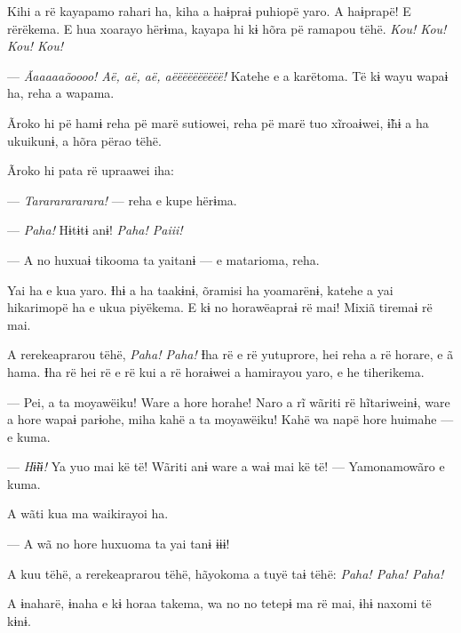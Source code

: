 Kihi a rë kayapamo rahari ha, kiha a haɨpraɨ puhiopë yaro. A haɨprapë! E
rërëkema. E hua xoarayo hërɨma, kayapa hi kɨ hõra pë ramapou tëhë. \textit{Kou! Kou! Kou! Kou!} 

--- \textit{Ãaaaaaõoooo! Aë, aë, aë, aëëëëëëëëëë!} Katehe e a
karëtoma. Të kɨ wayu wapaɨ ha, reha a wapama. 

Ãroko hi pë hamɨ reha pë marë sutiowei, reha pë marë tuo xĩroaɨwei, 
ɨ̃hɨ a ha ukuikunɨ, a hõra përao tëhë. 

Ãroko hi pata rë upraawei iha:

--- \textit{Tarararararara!} --- reha e kupe hërɨma. 


--- \textit{Paha!} Hɨtɨtɨ anɨ! \textit{Paha! Paiii!} 


--- A no huxuaɨ tikooma ta yaitanɨ --- e matarioma, reha. 

Yai ha e kua yaro. Ɨhɨ a ha taakɨnɨ, õramisi ha yoamarënɨ, katehe a yai
hikarimopë ha e ukua piyëkema. E kɨ no horawëapraɨ rë mai! Mixiã tiremaɨ
rë mai. 

A rerekeaprarou tëhë, \textit{Paha! Paha!} Ɨha rë e rë yutuprore, hei reha a rë
horare, e ã hama. Ɨha rë hei rë e rë kui a rë horaɨwei a hamirayou yaro,
e he tiherikema. 

--- Pei, a ta moyawëiku! Ware a hore horahe! Naro a rĩ wãriti rë
hĩtariweinɨ, ware a hore wapaɨ parɨohe, miha kahë a ta moyawëiku! Kahë
wa napë hore huimahe --- e kuma. 

--- \textit{Hɨ̃ɨɨ!} Ya yuo mai kë të! Wãriti anɨ ware a waɨ mai kë të! ---
Yamonamowãro e kuma. 

A wãti kua ma waikirayoi ha. 

--- A wã no hore huxuoma ta yai tanɨ ɨɨɨ!

A kuu tëhë, a rerekeaprarou tëhë, hãyokoma a tuyë taɨ tëhë: \textit{Paha! Paha!
Paha!} 

A ɨnaharë, ɨnaha e kɨ horaa takema, wa no no tetepɨ ma rë mai, ɨhɨ
naxomi të kɨnɨ. 

